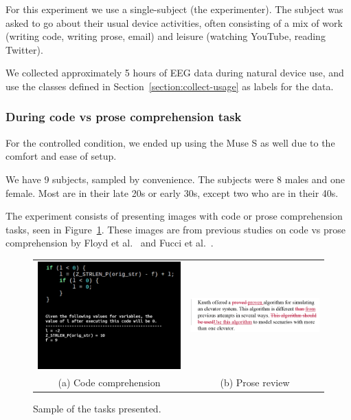             For this experiment we use a single-subject (the experimenter). The subject was asked to go about their usual device activities, often consisting of a mix of work (writing code, writing prose, email) and leisure (watching YouTube, reading Twitter).
            
            We collected approximately 5 hours of EEG data during natural device use, and use the classes defined in Section~\ref{section:collect-usage} as labels for the data.

        \subsubsection*{During code vs prose comprehension task}

            For the controlled condition, we ended up using the Muse S as well due to the comfort and ease of setup.

            We have 9 subjects, sampled by convenience. The subjects were 8 males and one female. Most are in their late 20s or early 30s, except two who are in their 40s.

            The experiment consists of presenting images with code or prose comprehension tasks, seen in Figure~\ref{fig:tasks}. These images are from previous studies on code vs prose comprehension by Floyd et al.~\cite{floyd_decoding_2017} and Fucci et al.~\cite{fucci_replication_2019}. 

            \begin{figure}[H]
                \centering
                \begin{tabular}{cc}
                    \includegraphics[trim=25 160 0 0,clip,width=75mm]{img/final-1-1.png}
                    &
                    \includegraphics[trim=20 0 20 0,clip,width=75mm]{img/bugs_1.PNG}
                    \\
                    (a) Code comprehension
                    &
                    (b) Prose review
                \end{tabular}
                \caption{Sample of the tasks presented.}\label{fig:tasks}
            \end{figure}


